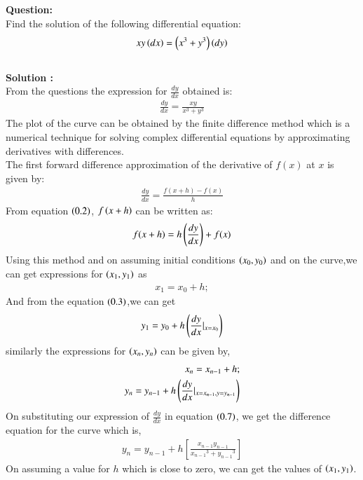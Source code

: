 \documentclass[journal]{IEEEtran}
\begin{document}
\textbf{Question:}
\\
Find the solution of the following differential equation:
\begin{align*} 
 xy\left(dx\right) = \left(x^3 + y^3\right)\left(dy\right)
\end{align*}
\\
\textbf{Solution :}
\\
From the questions the expression for $\frac{dy}{dx}$ obtained is:
\begin{align}
    \frac{dy}{dx} = \frac{xy}{x^3 + y^3}
\end{align}
The plot of the curve can be obtained by the finite difference method which is a numerical technique for solving complex  differential equations by approximating derivatives with differences.\\
The first forward difference approximation of the derivative of $f(x)$ at $x$ is given by: \\
\begin{align}
    \frac{dy}{dx}=\frac{f(x+h)-f(x)}{h}      
\end{align}
From equation $\left(0.2\right)$, $f\left(x+h\right)$ can be written as:
\begin{align}
    f(x+h) = h\left(\frac{dy}{dx}\right) + f(x)
\end{align}
 Using this method and on assuming initial conditions $\left(x_0,y_0\right)$ and on the curve,we can get expressions for $\left(x_1,y_1\right)$ as 
\begin{align}
    x_1 = x_0 + h;
\end{align}
And from the equation $\left(0.3\right)$,we can get
\begin{align}
  y_1 = y_0 + h\left(\frac{dy}{dx}|_{x=x_0}\right)   
\end{align}
similarly the expressions for $\left(x_n,y_n\right)$ can be given by,
\begin{align}
    x_n = x_{n-1} + h ;\\
y_n = y_{n-1} + h\left(\frac{dy}{dx}|_{x=x_{n-1},y=y_{n-1}}\right)
\end{align}
On substituting our expression of $\frac{dy}{dx}$ in equation $\left(0.7\right)$, we get the difference equation for the curve which is,
\begin{align}
    y_n = y_{n-1} + h\left[ \frac{x_{n-1}y_{n-1}}{{x_{n-1}}^3 + {y_{n-1}}^3}\right]
\end{align}
On assuming a value for $h$ which is close to zero, we can get the values of $\left(x_1,y_1\right)$.\\
\end{document}
